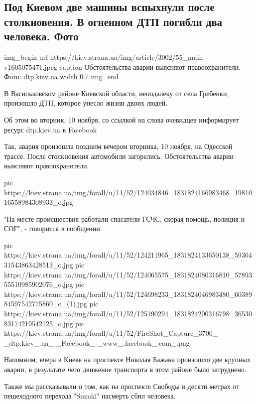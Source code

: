  
 
 

\subsection{Под Киевом две машины вспыхнули после столкновения. В огненном ДТП погибли два человека. Фото}
\label{sec:11_11_2020.news.ua.strana.1.dtp_grebenki}

\ifcmt
img_begin 
	url https://kiev.strana.ua/img/article/3002/55_main-v1605075471.jpeg
	caption Обстоятельства аварии выясняют правоохранители. Фото: dtp.kiev.ua 
	width 0.7
img_end
\fi

В Васильковском районе Киевской области, неподалеку от села Гребенки, произошло
ДТП, которое унесло жизни двоих людей.

Об этом во вторник, 10 ноября, со ссылкой на слова очевидцев информирует ресурс
dtp.kiev.ua в Facebook

Так, авария произошла поздним вечером вторника, 10 ноября, на Одесской трассе.
После столкновения автомобили загорелись. Обстоятельства аварии выясняют
правоохранители.

\ifcmt
pic https://kiev.strana.ua/img/forall/u/11/52/124034846_1831824166983468_1981016558984308933_o.jpg
\fi

"На месте происшествия работали спасатели ГСЧС, скорая помощь, полиция и СОГ",
- говорится в сообщении.

\ifcmt
pic https://kiev.strana.ua/img/forall/u/11/52/124211965_1831824133650138_5936431543863428513_o.jpg
pic https://kiev.strana.ua/img/forall/u/11/52/124065575_1831824080316810_5789355510985902076_o.jpg
pic https://kiev.strana.ua/img/forall/u/11/52/124698233_1831824046983480_6038984597542775860_o_(1).jpg
pic https://kiev.strana.ua/img/forall/u/11/52/125190294_1831824200316798_3653083174219542125_o.jpg
pic https://kiev.strana.ua/img/forall/u/11/52/FireShot_Capture_3700_-_dtp.kiev_.ua_-_Facebook_-_www_.facebook_.com_.png
\fi

Напомним, вчера в Киеве на проспекте Николая Бажана произошло две крупных
аварии, в результате чего движение транспорта в этом районе было затруднено.

Также мы рассказывали о том, как на проспекте Свободы в десяти метрах от
пешеходного перехода "Suzuki" насмерть сбил человека.
